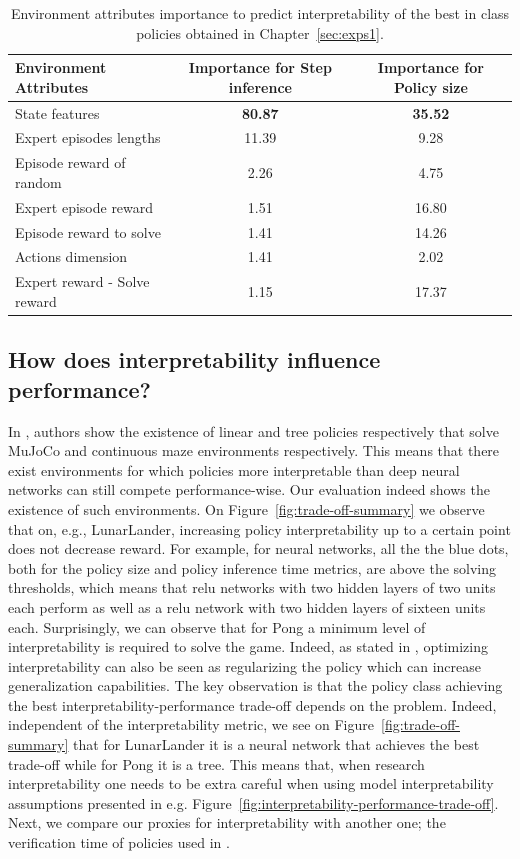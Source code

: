\begin{table}
\centering
\small
\begin{tabular}{lcc}
\toprule
Environment Attributes & Importance for Step inference & Importance for Policy size \\
\midrule
State features & \textbf{80.87} & \textbf{35.52} \\
Expert episodes lengths & 11.39 & 9.28 \\
Episode reward of random & 2.26 & 4.75 \\
Expert episode reward & 1.51 & 16.80 \\
Episode reward to solve & 1.41 & 14.26 \\
Actions dimension & 1.41 & 2.02 \\
Expert reward - Solve reward & 1.15 & 17.37 \\
\bottomrule
\end{tabular}
\caption{Environment attributes importance to predict interpretability of the best in class policies obtained in Chapter~\ref{sec:exps1}.}
\label{tab:combined_importance}
\end{table}

\subsection{How does interpretability influence performance?}
In \cite{empirical-evidence,theory1}, authors show the existence of linear and tree policies respectively that solve MuJoCo and continuous maze environments respectively.
This means that there exist environments for which policies more interpretable than deep neural networks can still compete performance-wise.
Our evaluation indeed shows the existence of such environments.
On Figure~\ref{fig:trade-off-summary} we observe that on, e.g., LunarLander, increasing policy interpretability up to a certain point does not decrease reward.
For example, for neural networks, all the the blue dots, both for the policy size and policy inference time metrics, are above the solving thresholds, which means that relu networks with two hidden layers of two units each perform as well as a relu network with two hidden layers of sixteen units each. 
Surprisingly, we can observe that for Pong a minimum level of interpretability is required to solve the game.
Indeed, as stated in \cite{study-0}, optimizing interpretability can also be seen as regularizing the policy which can increase generalization capabilities. 
The key observation is that the policy class achieving the best interpretability-performance trade-off depends on the problem.
Indeed, independent of the interpretability metric, we see on Figure~\ref{fig:trade-off-summary} that for LunarLander it is a neural network that achieves the best trade-off while for Pong it is a tree.
This means that, when research interpretability one needs to be extra careful when using model interpretability assumptions presented in e.g. Figure~\ref{fig:interpretability-performance-trade-off}.
Next, we compare our proxies for interpretability with another one; the verification time of policies used in \cite{viper,lens-complexity}.


